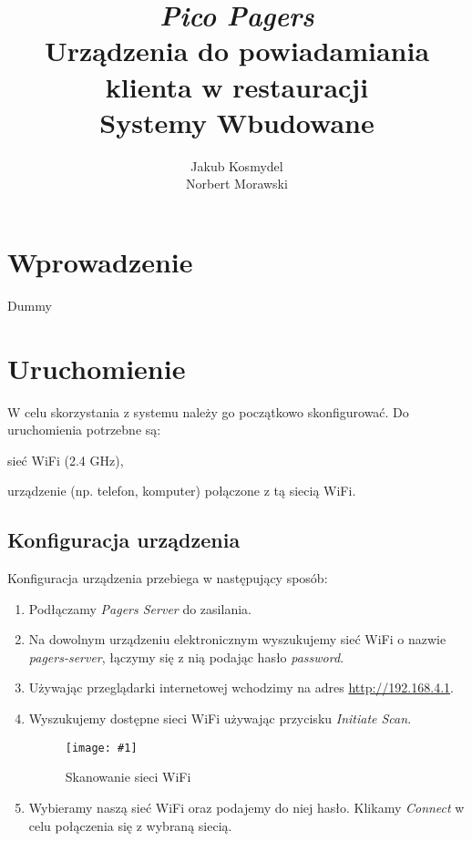 \documentclass[12pt]{article}
\let\tempone\itemize
\let\temptwo\enditemize
\renewenvironment{itemize}{\tempone\setlength{\itemsep}{0cm}}{\temptwo}
\newcommand{\imgcustomsize}[3]{
	\begin{figure}[H]
		\centering
		\texttt{[image: \#1]}
		\caption{#2}
	\end{figure}
}
\newcommand{\img}[2]{\imgcustomsize{#1}{#2}{0.8}}
\begin{document}
	
	\title{\textit{Pico Pagers} \\ Urządzenia do powiadamiania klienta w restauracji \\
		\vspace{0.2cm}
		\large Systemy Wbudowane}
	\author{Jakub Kosmydel \\
		Norbert Morawski}
	
	\maketitle
	\tableofcontents
	\pagebreak
	
	
	\section{Wprowadzenie}
		Dummy
		
    \section{Uruchomienie}
        W celu skorzystania z systemu należy go początkowo skonfigurować. Do uruchomienia potrzebne są:
        \begin{itemize}
            \item sieć WiFi (2.4 GHz),
            \item urządzenie (np. telefon, komputer) połączone z tą siecią WiFi.
        \end{itemize}
        \subsection{Konfiguracja urządzenia}
        Konfiguracja urządzenia przebiega w następujący sposób:
        \begin{enumerate}
            \item Podłączamy \emph{Pagers Server} do zasilania.
            \item Na dowolnym urządzeniu elektronicznym wyszukujemy sieć WiFi o nazwie \mbox{\emph{pagers-server}}, łączymy się z nią podając hasło \mbox{\emph{password}}.
            \item Używając przeglądarki internetowej wchodzimy na adres \url{http://192.168.4.1}.
            \item Wyszukujemy dostępne sieci WiFi używając przycisku \emph{Initiate Scan}.
            \img{config/scan_init}{Skanowanie sieci WiFi}
            \item Wybieramy naszą sieć WiFi oraz podajemy do niej hasło. Klikamy \emph{Connect} w celu połączenia się z wybraną siecią.
        \end{enumerate}
\end{document}

